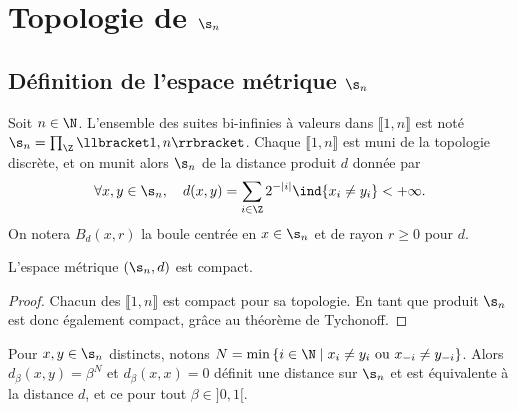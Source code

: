 \section{Topologie de $\s_n$}

  \subsection{Définition de l'espace métrique $\s_n$}

  \begin{definition}
    \label{def:topo_sn}
    \leanok
    Soit $n \in \N$.
    L'ensemble des suites bi-infinies à valeurs dans $\llbracket 1, n\rrbracket$ est noté $\s_n = \prod_{\Z}{\llbracket 1, n\rrbracket}$.
    Chaque $\llbracket 1, n\rrbracket$ est muni de la topologie discrète,
    et on munit alors $\s_n$ de la distance produit $d$ donnée par
    $$\forall x, y \in \s_n,\hspace{1em} d(x, y) = \sum_{i\in\Z}{2^{-|i|}\ind{x_i \not= y_i}} < +\infty.$$
    On notera $B_d(x, r)$ la boule centrée en $x \in \s_n$ et de rayon $r \geq 0$ pour $d$.
  \end{definition}

  \begin{proposition}
    \label{prop:sn_compact}
    \leanok
    L'espace métrique $(\s_n, d)$ est compact.
  \end{proposition}

  \begin{proof}
    \leanok
    Chacun des $\llbracket 1, n\rrbracket$ est compact pour sa topologie.
    En tant que produit $\s_n$ est donc également compact, grâce au théorème de Tychonoff.
  \end{proof}

  \begin{remark}
    \label{rm:dist_equiv}
    Pour $x, y \in \s_n$ distincts, notons $N = \min\left\{i \in \N \mid x_i \not= y_i \text{ ou } x_{-i} \not= y_{-i}\right\}$.
    Alors $d_{\beta}(x, y) = \beta^N$ et $d_{\beta}(x, x) = 0$ définit une distance sur $\s_n$ et est équivalente à la distance $d$,
    et ce pour tout $\beta \in ]0, 1[$.
  \end{remark}

